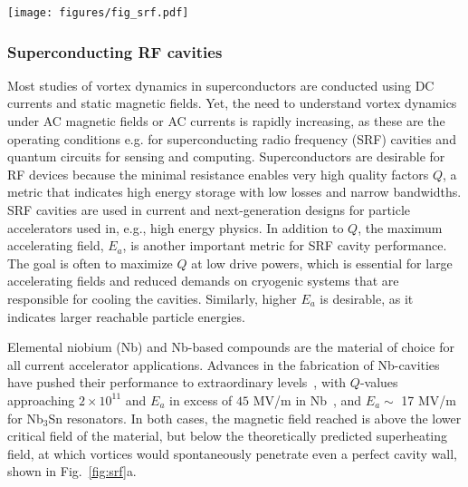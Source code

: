 \documentclass[%
 aip,
 amsmath,amssymb,
 reprint,%
floatfix]{revtex4-1}
\begin{document}
\begin{figure*}
\centering
\texttt{[image: figures/fig\_srf.pdf]}
\caption{\label{fig:srf} Surface disorder and multilayers in SRF cavities. \textbf{(a)} Sketch showing how vortices (red) parallel to the surface of a cavity wall penetrate the wall (outside the superconductor, the red lines illustrate field lines),  \textbf{(b)} intercalating insulating layers (SI[SI]S) will cause vortex pancakes to form and might limit the penetration depth of vortices~\cite{Gurevich2006,Gurevich2017}. \textbf{(c)} Simulation snapshot of surface vortex penetration into a type-II superconductor having spherical defects (yellow) near the surface in an AC magnetic field parallel to the surface. Vortex lines are shown in red. The planar projection shows the superconducting order parameter amplitude.}
\end{figure*}

\subsubsection{Superconducting RF cavities}

Most studies of vortex dynamics in superconductors are conducted using DC currents and static magnetic fields. Yet, the need to understand vortex dynamics under AC magnetic fields or AC currents is rapidly increasing, as these are the operating conditions e.g. for superconducting radio frequency (SRF) cavities and quantum circuits for sensing and computing.  Superconductors are desirable for RF devices because the minimal resistance enables very high quality factors $Q$, a metric that indicates high energy storage with low losses and narrow bandwidths.  SRF cavities are used in current and next-generation designs for particle accelerators used in, e.g., high energy physics.  In addition to $Q$, the maximum accelerating field, $E_a$, is another important metric for SRF cavity performance. The goal is often to maximize $Q$ at low drive powers, which is essential for large accelerating fields and reduced demands on cryogenic systems that are responsible for cooling the cavities. Similarly, higher $E_a$ is desirable, as it indicates larger reachable particle energies. 



Elemental niobium (Nb) and Nb-based compounds are the material of choice for all current accelerator applications.  Advances in the fabrication of Nb-cavities have pushed their performance to extraordinary levels~\cite{rfbook,SRF2017}, with $Q$-values approaching $2\times 10^{11}$ and $E_a$ in excess of $45$ MV/m in Nb~\cite{qf2007}, and $E_a\sim$ 17 MV/m for Nb$_3$Sn resonators. In both cases, the magnetic field reached is above the lower critical field of the material, but below the theoretically predicted superheating field, at which vortices would spontaneously penetrate even a perfect cavity wall, shown in  Fig.~\ref{fig:srf}a.
\end{document}
